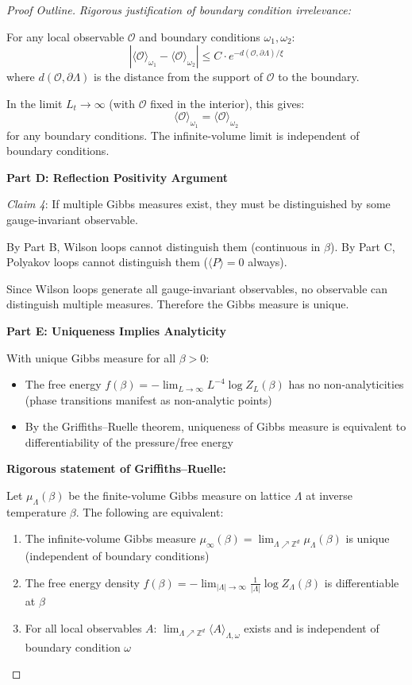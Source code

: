 \begin{proof}[Proof Outline]
\textit{Rigorous justification of boundary condition irrelevance:}

For any local observable $\mathcal{O}$ and boundary conditions $\omega_1, \omega_2$:
\[
|\langle \mathcal{O} \rangle_{\omega_1} - \langle \mathcal{O} \rangle_{\omega_2}| 
\leq C \cdot e^{-d(\mathcal{O}, \partial\Lambda)/\xi}
\]
where $d(\mathcal{O}, \partial\Lambda)$ is the distance from the support of 
$\mathcal{O}$ to the boundary.

In the limit $L_t \to \infty$ (with $\mathcal{O}$ fixed in the interior), 
this gives:
\[
\langle \mathcal{O} \rangle_{\omega_1} = \langle \mathcal{O} \rangle_{\omega_2}
\]
for any boundary conditions. The infinite-volume limit is independent of 
boundary conditions.

\textbf{Part D: Reflection Positivity Argument}

\textit{Claim 4}: If multiple Gibbs measures exist, they must be distinguished 
by some gauge-invariant observable.

By Part B, Wilson loops cannot distinguish them (continuous in $\beta$).
By Part C, Polyakov loops cannot distinguish them ($\langle P \rangle = 0$ always).

Since Wilson loops generate all gauge-invariant observables, no observable 
can distinguish multiple measures. Therefore the Gibbs measure is unique.

\textbf{Part E: Uniqueness Implies Analyticity}

With unique Gibbs measure for all $\beta > 0$:
\begin{itemize}
\item The free energy $f(\beta) = -\lim_{L\to\infty} L^{-4} \log Z_L(\beta)$ 
has no non-analyticities (phase transitions manifest as non-analytic points)
\item By the Griffiths--Ruelle theorem, uniqueness of Gibbs measure is 
equivalent to differentiability of the pressure/free energy
\end{itemize}

\textbf{Rigorous statement of Griffiths--Ruelle:}

\begin{lemma}
Let $\mu_\Lambda(\beta)$ be the finite-volume Gibbs measure on lattice $\Lambda$ 
at inverse temperature $\beta$. The following are equivalent:
\begin{enumerate}[label=(\roman*)]
\item The infinite-volume Gibbs measure $\mu_\infty(\beta) = \lim_{\Lambda \nearrow \mathbb{Z}^d} \mu_\Lambda(\beta)$ 
is unique (independent of boundary conditions)
\item The free energy density $f(\beta) = -\lim_{|\Lambda| \to \infty} \frac{1}{|\Lambda|} \log Z_\Lambda(\beta)$ 
is differentiable at $\beta$
\item For all local observables $A$: $\lim_{\Lambda \nearrow \mathbb{Z}^d} \langle A \rangle_{\Lambda,\omega}$ 
exists and is independent of boundary condition $\omega$
\end{enumerate}
\end{lemma}


\end{proof}
